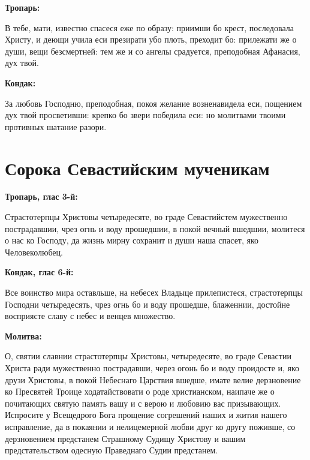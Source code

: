 \bfseries Тропарь:\normalfont{}

 В тебе, мати, известно спасеся еже по образу: приимши бо крест, последовала Христу, и деющи учила еси презирати убо плоть, преходит бо: прилежати же о души, вещи безсмертней: тем же и со ангелы срадуется, преподобная Афанасия, дух твой.


\bfseries Кондак:\normalfont{}

 За любовь Господню, преподобная, покоя желание возненавидела еси, пощением дух твой просветивши: крепко бо звери победила еси: но молитвами твоими противных шатание разори.


\bigskip\bigskip\mychapterending


 

\section{Сорока Севастийским мученикам}
 

\bfseries Тропарь, глас 3-й:\normalfont{}


Страстотерпцы Христовы четыредесяте, во граде Севастийстем мужественно пострадавшии, чрез огнь и воду прошедшии, в покой вечный вшедшии, молитеся о нас ко Господу, да жизнь мирну сохранит и души наша спасет, яко Человеколюбец.


\medskip


\bfseries Кондак, глас 6-й:\normalfont{}


Все воинство мира оставльше, на небесех Владыце прилепистеся, страстотерпцы Господни четыредесять, чрез огнь бо и воду прошедше, блаженнии, достойне восприясте славу с небес и венцев множество.


\medskip


\bfseries Молитва:\normalfont{}


О, святии славнии страстотерпцы Христовы, четыредесяте, во граде Севастии Христа ради мужественно пострадавши, через огонь бо и воду проидосте и, яко друзи Христовы, в покой Небеснаго Царствия вшедше, имате велие дерзновение ко Пресвятей Троице ходатайствовати о роде христианском, наипаче же о почитающих святую память вашу и с верою и любовию вас призывающих. Испросите у Всещедрого Бога прощение согрешений наших и жития нашего исправление, да в покаянии и нелицемерной любви друг ко другу поживше, со дерзновением предстанем Страшному Судищу Христову и вашим предстательством одесную Праведнаго Судии предстанем.

